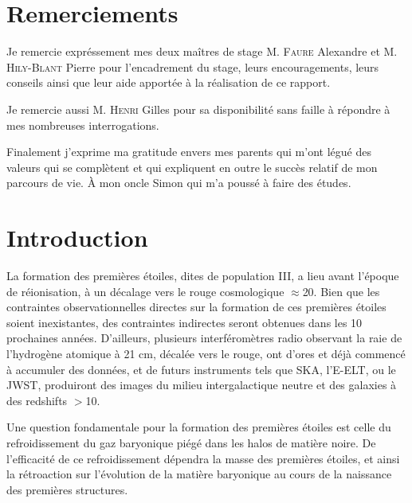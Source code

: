 \documentclass[10pt, a4paper]{report}
\numberwithin{equation}{subsection}
\begin{document}
\renewcommand{\contentsname}{Sommaire}
\renewcommand{\bibname}{Références}



\tableofcontents


\section*{Remerciements}
Je remercie expréssement mes deux maîtres de stage M. \textsc{Faure} Alexandre et M. \textsc{Hily-Blant} Pierre pour l'encadrement du stage, leurs encouragements, leurs conseils ainsi que leur aide apportée à la réalisation de ce rapport.

Je remercie aussi M. \textsc{Henri} Gilles pour sa disponibilité sans faille à répondre à mes nombreuses interrogations.

Finalement j'exprime ma gratitude envers mes parents qui m'ont légué des valeurs qui se complètent et qui expliquent en outre le succès relatif de mon parcours de vie. À mon oncle Simon qui m'a poussé à faire des études.
 

\section*{Introduction}
La formation des premières étoiles, dites de population III, a lieu avant l'époque de réionisation, à un décalage vers le rouge cosmologique $\approx$20. Bien que les contraintes observationnelles directes sur la formation de ces premières étoiles soient inexistantes, des contraintes indirectes seront obtenues dans les 10 prochaines années. D'ailleurs, plusieurs interféromètres radio observant la raie de l'hydrogène atomique à 21 cm, décalée vers le rouge, ont d'ores et déjà commencé à accumuler des données, et de futurs instruments tels que SKA, l'E-ELT, ou le JWST, produiront des images du milieu intergalactique neutre et des galaxies à des redshifts $>$10.

Une question fondamentale pour la formation des premières étoiles est celle du refroidissement du gaz baryonique piégé dans les halos de matière noire. De l'efficacité de ce refroidissement dépendra la masse des premières étoiles, et ainsi la rétroaction sur l'évolution de la matière baryonique au cours de la naissance des premières structures. 
\end{document}
